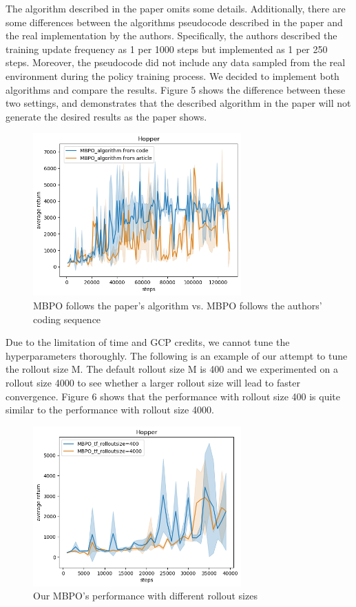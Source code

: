The algorithm described in the paper omits some details. Additionally, there are some differences between the algorithms pseudocode described in the paper and the real implementation by the authors. Specifically, the authors described the training update frequency as 1 per 1000 steps but implemented as 1 per 250 steps. Moreover, the pseudocode did not include any data sampled from the real environment during the policy training process. We decided to implement both algorithms and compare the results. Figure 5 shows the difference between these two settings, and demonstrates that the described algorithm in the paper will not generate the desired results as the paper shows.

\begin{figure}[h]
  \centering
  \includegraphics[width=8cm]{../openreview/paperVsCodeMBPO}
  \caption{MBPO follows the paper's algorithm vs. MBPO follows the authors' coding sequence}
\end{figure}

Due to the limitation of time and GCP credits, we cannot tune the hyperparameters thoroughly. The following is an example of our attempt to tune the rollout size M. The default rollout size M is 400 and we experimented on a rollout size 4000 to see whether a larger rollout size will lead to faster convergence. Figure 6 shows that the performance with rollout size 400 is quite similar to the performance with rollout size 4000.

\begin{figure}[h]
  \centering
  \includegraphics[width=8cm]{../openreview/differentRollOutSize}
  \caption{Our MBPO's performance with different rollout sizes}
\end{figure}

